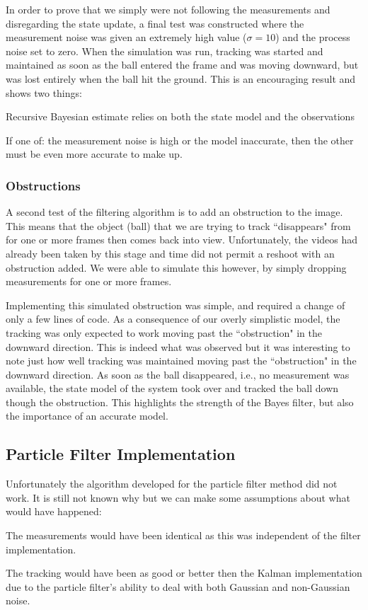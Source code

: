In order to prove that we simply were not following the measurements and
disregarding the state update, a final test was constructed where the measurement
noise was given an extremely high value ($\sigma = 10$) and the process noise set
to zero. When the simulation was run, tracking was started and maintained as
soon as the ball entered the frame and was moving downward, but was lost entirely
when the ball hit the ground. This is an encouraging result and shows two things:
\begin{compactitem}
\item Recursive Bayesian estimate relies on both the state model and the observations
\item If one of: the measurement noise is high or the model inaccurate, then the
other must be even more accurate to make up.
\end{compactitem}


\subsubsection{Obstructions}
A second test of the filtering algorithm is to add an obstruction to the image.
This means that the object (ball) that we are trying to track ``disappears" from
for one or more frames then comes back into view. Unfortunately, the videos
had already been taken by this stage and time did not permit a reshoot with
an obstruction added. We were able to simulate this however, by simply dropping
measurements for one or more frames.

Implementing this simulated obstruction was simple, and required a change of
only a few lines of code. As a consequence of our overly simplistic model, the
tracking was only expected to work moving past the ``obstruction" in the
downward direction. This is indeed what was observed but it was interesting to
note just how well tracking was maintained moving past the ``obstruction" in
the downward direction. As soon as the ball disappeared, i.e., no measurement was
available, the state model of the system took over and tracked the ball down
though the obstruction. This highlights the strength of the Bayes filter, but also
the importance of an accurate model.

\subsection{Particle Filter Implementation}
Unfortunately the algorithm developed for the particle filter method did not work.
It is still not known why but we can make some assumptions about what would
have happened:
\begin{compactitem}
\item The measurements would have been identical as this was independent of the
filter implementation.
\item The tracking would have been as good or better then the Kalman implementation
due to the particle filter's ability to deal with both Gaussian and non-Gaussian
noise.
\end{compactitem}

